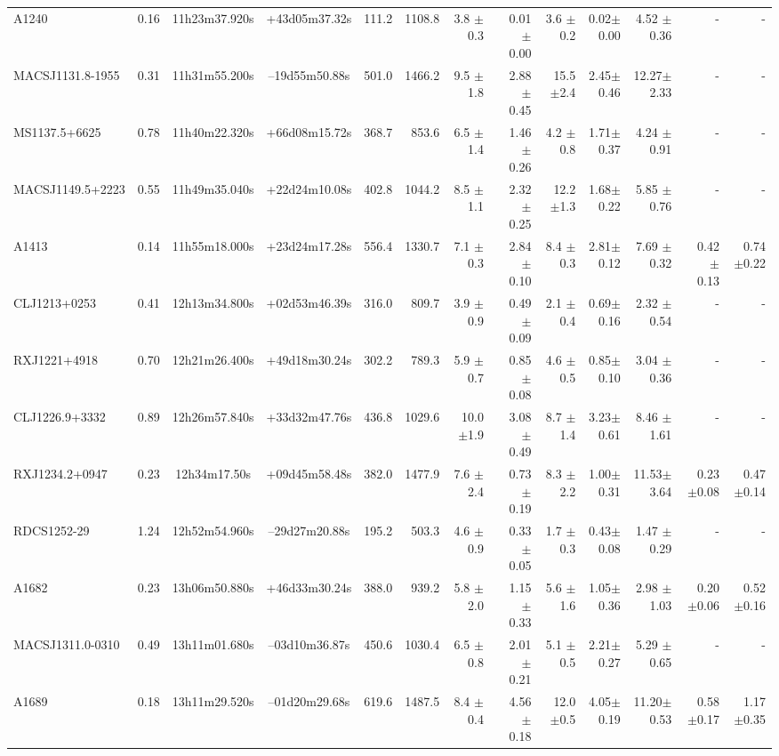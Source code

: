\documentclass{aa}
\begin{document}
\begin{landscape}
\begin{longtable}{lcccrrrrrrrrr}
A1240   	 &0.16 & 11h23m37.920s &+43d05m37.32s  &  111.2   &  1108.8  &  3.8  $\pm$0.3 & 0.01 $\pm$ 0.00&3.6  $\pm$0.2  & 0.02$\pm$0.00& 4.52 $\pm$0.36& - & -   \\
MACSJ1131.8-1955 &0.31 & 11h31m55.200s &--19d55m50.88s  &  501.0   &  1466.2  &  9.5  $\pm$1.8 & 2.88 $\pm$ 0.45&15.5 $\pm$2.4  & 2.45$\pm$0.46& 12.27$\pm$2.33& - & -   \\
MS1137.5+6625   &0.78 & 11h40m22.320s &+66d08m15.72s  &  368.7   &  853.6   &  6.5  $\pm$1.4 & 1.46 $\pm$ 0.26&4.2  $\pm$0.8  & 1.71$\pm$0.37& 4.24 $\pm$0.91& - & -   \\
MACSJ1149.5+2223&0.55 & 11h49m35.040s &+22d24m10.08s  &  402.8   &  1044.2  &  8.5  $\pm$1.1 & 2.32 $\pm$ 0.25&12.2 $\pm$1.3  & 1.68$\pm$0.22& 5.85 $\pm$0.76& - & -   \\
A1413   	 &0.14 & 11h55m18.000s &+23d24m17.28s  &  556.4   &  1330.7  &  7.1  $\pm$0.3 & 2.84 $\pm$ 0.10&8.4  $\pm$0.3  & 2.81$\pm$0.12& 7.69 $\pm$0.32&  0.42  $\pm$ 0.13 & 0.74 $\pm$0.22  \\
CLJ1213+0253	 &0.41 & 12h13m34.800s &+02d53m46.39s  &  316.0   &  809.7   &  3.9  $\pm$0.9 & 0.49 $\pm$ 0.09&2.1  $\pm$0.4  & 0.69$\pm$0.16& 2.32 $\pm$0.54& - & -   \\
RXJ1221+4918	 &0.70 & 12h21m26.400s &+49d18m30.24s  &  302.2   &  789.3   &  5.9  $\pm$0.7 & 0.85 $\pm$ 0.08&4.6  $\pm$0.5  & 0.85$\pm$0.10& 3.04 $\pm$0.36& - & -   \\
CLJ1226.9+3332  &0.89 & 12h26m57.840s &+33d32m47.76s  &  436.8   &  1029.6  &  10.0 $\pm$1.9 & 3.08 $\pm$ 0.49&8.7  $\pm$1.4  & 3.23$\pm$0.61& 8.46 $\pm$1.61& - & -   \\
RXJ1234.2+0947  &0.23 & 12h34m17.50s &+09d45m58.48s  &  382.0   &  1477.9  &  7.6  $\pm$2.4 & 0.73 $\pm$ 0.19&8.3  $\pm$2.2  & 1.00$\pm$0.31& 11.53$\pm$3.64& 0.23 $\pm$0.08 & 0.47 $\pm$0.14  \\
RDCS1252-29	 &1.24 & 12h52m54.960s &--29d27m20.88s  &  195.2   &  503.3   &  4.6  $\pm$0.9 & 0.33 $\pm$ 0.05&1.7  $\pm$0.3  & 0.43$\pm$0.08& 1.47 $\pm$0.29& - & -   \\
A1682   	 &0.23 & 13h06m50.880s &+46d33m30.24s  &  388.0   &  939.2   &  5.8  $\pm$2.0 & 1.15 $\pm$ 0.33&5.6  $\pm$1.6  & 1.05$\pm$0.36& 2.98 $\pm$1.03& 0.20 $\pm$0.06 & 0.52 $\pm$0.16  \\
MACSJ1311.0-0310 &0.49 & 13h11m01.680s &--03d10m36.87s  &  450.6   &  1030.4  &  6.5  $\pm$0.8 & 2.01 $\pm$ 0.21&5.1  $\pm$0.5  & 2.21$\pm$0.27& 5.29 $\pm$0.65& - & -   \\
A1689 		 &0.18 & 13h11m29.520s &--01d20m29.68s  &  619.6   &  1487.5  &  8.4  $\pm$0.4 & 4.56 $\pm$ 0.18&12.0 $\pm$0.5  & 4.05$\pm$0.19& 11.20$\pm$0.53& 0.58 $\pm$0.17 & 1.17 $\pm$0.35  \\

\end{longtable}
\end{landscape}
\end{document}
